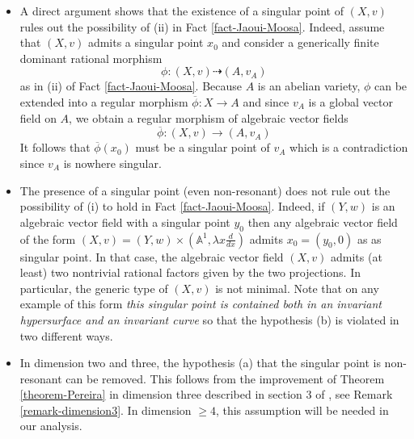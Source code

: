 \documentclass[12pt]{amsart}
\theoremstyle{definition}
\theoremstyle{plain}
\theoremstyle{exampstyle}
\theoremstyle{exampstyle}\newtheorem{thmxbis}{Theorem}
\numberwithin{equation}{section}
\theoremstyle{remark}
\begin{document}
{\remark \label{remark-theoremminimality2} \text{ } 


\begin{itemize} 
\item A direct argument shows that the existence of a singular point of $(X,v)$ rules out the possibility of (ii) in Fact \ref{fact-Jaoui-Moosa}. Indeed, assume that $(X,v)$ admits a singular point $x_0$ and consider a generically finite dominant rational morphism 
$$ \phi:(X,v) \dashrightarrow (A,v_A)$$
as in (ii) of Fact \ref{fact-Jaoui-Moosa}. Because $A$ is an abelian variety, $\phi$ can be extended into a regular morphism $\overline{\phi}: X \rightarrow A$ and since $v_A$ is a global vector field on $A$, we obtain a regular morphism of algebraic vector fields 
$$ \overline{\phi}:(X,v) \rightarrow (A,v_A)$$
It follows that $\overline{\phi}(x_0)$ must be a singular point of $v_A$ which is a contradiction since $v_A$ is nowhere singular. 

\item The presence of a singular point (even non-resonant) does not rule out the possibility of (i) to hold in Fact \ref{fact-Jaoui-Moosa}. Indeed, if $(Y,w)$ is an algebraic vector field with a singular point $y_0$ then any algebraic vector field of the form $(X,v) = (Y,w) \times (\mathbb{A}^1, \lambda x \frac d {dx})$ admits $x_0 = (y_0,0)$ as as singular point. In that case, the algebraic vector field $(X,v)$ admits (at least) two nontrivial rational factors given by the two projections. In particular, the generic type of $(X,v)$ is not minimal. Note  that on any example of this form {\em this singular point is contained both in an invariant hypersurface and an invariant curve} so that the hypothesis (b) is violated in two different ways. 


\item In dimension two and three, the hypothesis (a) that the singular point is non-resonant can be removed. This follows from the improvement of Theorem \ref{theorem-Pereira} in dimension three described in section 3 of \cite{Pereira-JEMS}, see Remark \ref{remark-dimension3}. In dimension $\geq 4$, this assumption will be needed in our analysis.
\end{itemize}}
\end{document}
